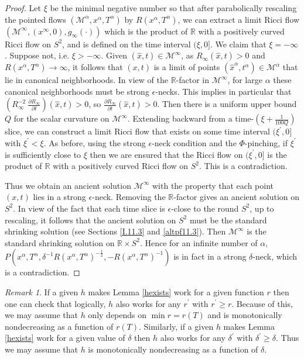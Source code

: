 \documentclass[12pt]{amsart}
\newcommand{\al}{\alpha}
\newcommand{\M}{{\mathcal M}}
\newcommand{\R}{{\mathbb R}}
\newcommand{\de}{\delta}
\numberwithin{equation}{section}
\theoremstyle{plain}
\theoremstyle{definition}
\theoremstyle{remark}
\newtheorem{remark}[equation]{Remark}
\begin{document}
\begin{proof}
Let $\xi$ be the minimal negative number so that after parabolically rescaling
the pointed flows 
$(\M^\al,x^\al,T^\al)$ by $R(x^\al,T^\al)$, we can extract a limit
Ricci flow $(\M^\infty, (x^\infty,0), g_\infty(\cdot))$ which is the product of $\R$ with 
a positively curved Ricci flow on $S^2$, and is defined on the
time interval $(\xi, 0]$.  We claim that $\xi =  - \infty$. Suppose
not, i.e. $\xi > - \infty$. Given $(\widehat{x}, t) \in \M^\infty$, 
as $R_\infty(\widehat{x}, t) > 0$ and 
$R(x^\al,T^\al) \rightarrow \infty$, it follows that
$(x, t)$ is a limit of points $(\widehat{x}^\al, t^\al) \in \M^\alpha$ 
that lie in canonical
neighborhoods.  In view of the $\R$-factor in $\M^\infty$, 
for large $\al$ these
canonical neighborhoods must be strong $\epsilon$-necks. 
This implies in particular that 
$\left( R_\infty^{-2} \: \frac{\partial R_\infty}{\partial t}\right)
(\widehat{x},t) > 0$, so
$\frac{\partial R_\infty}{\partial t}(\widehat{x},t) > 0$.
Then there
is a uniform upper bound $Q$ for the scalar curvature on $\M^\infty$. 
Extending  backward from a time-$(\xi + \frac{1}{100Q})$ slice, 
we can construct a limit Ricci flow that exists on some time interval
$(\xi^\prime, 0]$ with $\xi^\prime < \xi$. As before, using the
strong $\epsilon$-neck condition and the $\Phi$-pinching, if
$\xi^\prime$ is sufficiently close to $\xi$ then we are ensured
that the Ricci flow on $(\xi^\prime, 0]$ is the product of $\R$
with a positively curved Ricci flow on $S^2$. This is a contradiction.

Thus we obtain an ancient solution $\M^\infty$ 
with the property that each point
$(x, t)$ lies in a strong $\epsilon$-neck. Removing the $\R$-factor gives an
ancient solution on $S^2$. In view of the fact that each time slice is
$\epsilon$-close to the round $S^2$, up to rescaling, it follows that
the ancient solution on $S^2$ must be the standard shrinking
solution (see Sections \ref{I.11.3} and \ref{altpf11.3}). 
Then $\M^\infty$ is the standard shrinking solution
on $\R \times S^2$. Hence for an infinite number of
$\alpha$,  $P(x^\al,T^\al,\de^{-1}R(x^\al,T^\al)^{-\frac12},
-R(x^\al,T^\al)^{-1})$ is in fact in a strong $\delta$-neck, which is a
contradiction. 
\end{proof}

 \begin{remark}
If a given $h$ makes Lemma \ref{hexists} work for a given function $r$ then
one can check that logically, $h$ also works for any $r^\prime$
with $r^\prime \ge r$. Because of this, we may assume that $h$ only
depends on $\min r=r(T)$ and is monotonically nondecreasing as a
function of $r(T)$. Similarly, if a given $h$ makes Lemma \ref{hexists}
work for a given value of $\delta$ then $h$ also works for any
$\delta^\prime$ with $\delta^\prime  \ge\delta$.  Thus we may assume
that $h$ is monotonically nondecreasing as a function of $\delta$.
\end{remark} 
\end{document}

